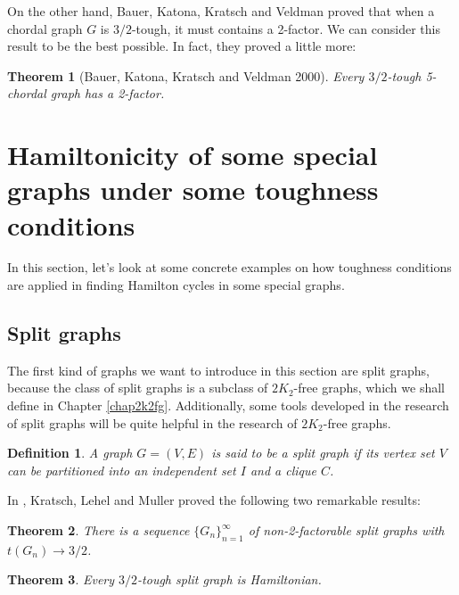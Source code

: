 \documentclass[12pt]{report}
\newtheorem{theorem}{Theorem}
\newtheorem{definition}{Definition}
\begin{document}
On the other hand, Bauer, Katona, Kratsch and Veldman \cite{bauer2000chordality} proved that when a chordal graph $G$ is $3/2$-tough, it must contains a 2-factor. We can consider this result to be the best possible. In fact, they proved a little more:
\begin{theorem}[Bauer, Katona, Kratsch and Veldman 2000]\label{32tchgc2fth}
Every $3/2$-tough 5-chordal graph has a 2-factor.
\end{theorem}











\section{Hamiltonicity of some special graphs under some toughness conditions}
In this section, let's look at some concrete examples on how toughness conditions are applied in finding Hamilton cycles in some special graphs.
\subsection{Split graphs}


The first kind of graphs we want to introduce in this section are split graphs, because the class of split graphs is a subclass of $2K_2$-free graphs, which we shall define in Chapter \ref{chap2k2fg}. Additionally, some tools developed in the research of split graphs will be quite helpful in the research of $2K_2$-free graphs.

\begin{definition}
A graph $G=(V,E)$ is said to be a split graph if its vertex set $V$ can be partitioned into an independent set $I$ and a clique $C$.
\end{definition}

In \cite{kratsch1996toughness}, Kratsch, Lehel and Muller proved the following two remarkable results:
\begin{theorem}\label{spn}{\cite[Theorem 3.1.]{kratsch1996toughness}}
There is a sequence $\{G_n\}^{\infty}_{n=1}$ of non-2-factorable split graphs with $t(G_n)\to3/2$.

\end{theorem}



\begin{theorem}\label{split}{\cite[Theorem 3.3.]{kratsch1996toughness}}
Every $3/2$-tough split graph is Hamiltonian.
\end{theorem}
\end{document}
